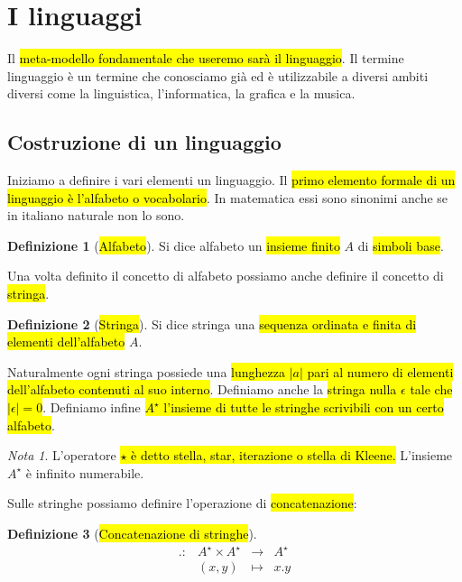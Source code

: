 \documentclass[a4paper,11pt,twoside]{article}
\theoremstyle{plain}
\theoremstyle{definition}
\newtheorem{defn}{Definizione}[section]
\theoremstyle{remark}
\newtheorem*{nota}{Nota}
\begin{document}
\section{I linguaggi}\label{sec:linguaggi}

Il \hl{meta-modello fondamentale che useremo sarà il linguaggio}. Il termine
linguaggio è un termine che conosciamo già ed è utilizzabile a diversi ambiti
diversi come la linguistica, l'informatica, la grafica e la musica.

\subsection{Costruzione di un linguaggio}\label{sec:linguaggi-costruzione}

Iniziamo a definire i vari elementi un linguaggio. Il \hl{primo elemento formale
di un linguaggio è l'alfabeto o vocabolario}. In matematica essi sono sinonimi
anche se in italiano naturale non lo sono.

\begin{defn}[\hl{Alfabeto}]\label{def:alfabeto}
  Si dice alfabeto un \hl{insieme finito} $A$ di \hl{simboli base}.
\end{defn}

Una volta definito il concetto di alfabeto possiamo anche definire il concetto
di \hl{stringa}.

\begin{defn}[\hl{Stringa}]\label{def:stringa}
  Si dice stringa una \hl{sequenza ordinata e finita di elementi dell'alfabeto}
  $A$.
\end{defn}

Naturalmente ogni stringa possiede una \hl{lunghezza $|a|$ pari al numero di
elementi dell'alfabeto contenuti al suo interno}. Definiamo anche la \hl{stringa
nulla $\epsilon$ tale che $|\epsilon|=0$}. Definiamo infine \hl{$A^\star$
l'insieme di tutte le stringhe scrivibili con un certo alfabeto}.

\begin{nota}
  L'operatore \hl{$\star$ è detto stella, star, iterazione o stella di Kleene.}
  L'insieme $A^\star$ è infinito numerabile.
\end{nota}

Sulle stringhe possiamo definire l'operazione di \hl{concatenazione}:

\begin{defn}[\hl{Concatenazione di stringhe}]\label{def:concatenazione-stringhe}
  \begin{equation}
    \begin{array}{cccc}
      . : & A^\star \times A^\star & \to & A^\star \\
          & (x, y) & \mapsto & x.y
    \end{array}
  \end{equation}
\end{defn}
\end{document}
